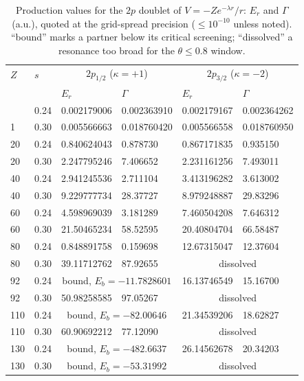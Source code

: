 \documentclass[aps,pra,twocolumn,superscriptaddress,floatfix,longbibliography]{revtex4-2}
\begin{document}
\begin{table}[t]
\caption{Production values for the $2p$ doublet of
$V=-Ze^{-\lambda r}/r$: $E_{r}$ and $\Gamma$ (a.u.), quoted at the
grid-spread precision ($\le10^{-10}$ unless noted). ``bound'' marks a
partner below its critical screening; ``dissolved'' a resonance too
broad for the $\theta\le0.8$ window. }
\label{tab:prod}
\begin{ruledtabular}
\begin{tabular}{llllll}
$Z$ & $s$ & \multicolumn{2}{c}{$2p_{1/2}$ ($\kappa=+1$)} &
\multicolumn{2}{c}{$2p_{3/2}$ ($\kappa=-2$)}\\
 & & $E_{r}$ & $\Gamma$ & $E_{r}$ & $\Gamma$\\
\colrule
1 & 0.24 & 0.002179006 & 0.002363910 & 0.002179167 & 0.002364262\\
1 & 0.30 & 0.005566663 & 0.018760420 & 0.005566558 & 0.018760950\\
20 & 0.24 & 0.840624043 & 0.878730 & 0.867171835 & 0.935150\\
20 & 0.30 & 2.247795246 & 7.406652 & 2.231161256 & 7.493011\\
40 & 0.24 & 2.941245536 & 2.711104 & 3.413196282 & 3.613002\\
40 & 0.30 & 9.229777734 & 28.37727 & 8.979248887 & 29.83296\\
60 & 0.24 & 4.598969039 & 3.181289 & 7.460504208 & 7.646312\\
60 & 0.30 & 21.50465234 & 58.52595 & 20.40804704 & 66.58487\\
80 & 0.24 & 0.848891758 & 0.159698 & 12.67315047 & 12.37604\\
80 & 0.30 & 39.11712762 & 87.92655 & \multicolumn{2}{c}{dissolved}\\
92 & 0.24 & \multicolumn{2}{c}{bound, $E_{b}=-11.7828601$} & 16.13746549 & 15.16700\\
92 & 0.30 & 50.98258585 & 97.05267 & \multicolumn{2}{c}{dissolved}\\
110 & 0.24 & \multicolumn{2}{c}{bound, $E_{b}=-82.00646$} & 21.34539206 & 18.62827\\
110 & 0.30 & 60.90692212 & 77.12090 & \multicolumn{2}{c}{dissolved}\\
130 & 0.24 & \multicolumn{2}{c}{bound, $E_{b}=-482.6637$} & 26.14562678 & 20.34203\\
130 & 0.30 & \multicolumn{2}{c}{bound, $E_{b}=-53.31992$} & \multicolumn{2}{c}{dissolved}\\
\end{tabular}
\end{ruledtabular}
\end{table}
\end{document}
